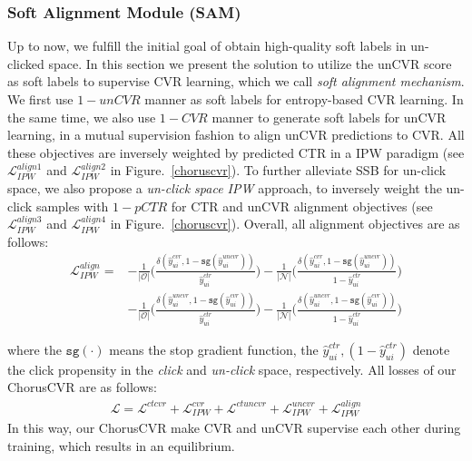 \subsubsection{Soft Alignment Module (SAM)}
Up to now, we fulfill the initial goal of obtain high-quality soft labels in un-clicked space. In this section we present the solution to utilize the unCVR score as soft labels to supervise CVR learning, which we call \emph{soft alignment mechanism}. We first use $1-unCVR$ manner as soft labels for entropy-based CVR learning. In the same time, we also use $1-CVR$ manner to generate soft labels for unCVR learning, in a mutual supervision fashion to align unCVR predictions to CVR. All these objectives are inversely weighted by predicted CTR in a IPW paradigm (see $\mathcal{L}^{align1}_{IPW}$ and $\mathcal{L}^{align2}_{IPW}$ in Figure.~\ref{choruscvr}). To further alleviate SSB for un-click space, we also propose a \textit{un-click space IPW} approach, to inversely weight the un-click samples with $1-pCTR$ for CTR and unCVR alignment objectives (see $\mathcal{L}^{align3}_{IPW}$ and $\mathcal{L}^{align4}_{IPW}$ in Figure.~\ref{choruscvr}). Overall, all alignment objectives are as follows:
\begin{equation}
\begin{split}
\mathcal{L}^{align}_{IPW} = &- \frac{1}{|\mathcal{O}|}\big(\frac{\delta(\hat{y}^{cvr}_{ui}, 1-\texttt{sg}(\hat{y}^{uncvr}_{ui}))}{\hat{y}^{ctr}_{ui}}\big)
- \frac{1}{|\mathcal{N}|}\big(\frac{\delta(\hat{y}^{cvr}_{ui}, 1-\texttt{sg}(\hat{y}^{uncvr}_{ui}))}{1-\hat{y}^{ctr}_{ui}}\big)\\
&- \frac{1}{|\mathcal{O}|}\big(\frac{\delta(\hat{y}^{uncvr}_{ui}, 1-\texttt{sg}(\hat{y}^{cvr}_{ui}))}{\hat{y}^{ctr}_{ui}}\big)
- \frac{1}{|\mathcal{N}|}\big(\frac{\delta(\hat{y}^{uncvr}_{ui}, 1-\texttt{sg}(\hat{y}^{cvr}_{ui}))}{1-\hat{y}^{ctr}_{ui}}\big)
\end{split}
\label{soft}
\end{equation}

where the $\texttt{sg}(\cdot)$ means the stop gradient function, the $\hat{y}^{ctr}_{ui}, (1 - \hat{y}^{ctr}_{ui})$ denote the click propensity in the \textit{click} and \textit{un-click} space, respectively.
% 
%
All losses of our ChorusCVR are as follows:
\begin{equation}
\begin{split}
\mathcal{L} = \mathcal{L}^{ctcvr} + \mathcal{L}^{cvr}_{IPW} + \mathcal{L}^{ctuncvr} + \mathcal{L}^{uncvr}_{IPW} + \mathcal{L}^{align}_{IPW}
\end{split}
\label{soft}
\end{equation}
In this way, our ChorusCVR  make CVR and unCVR supervise each other during training, which results in an equilibrium. 